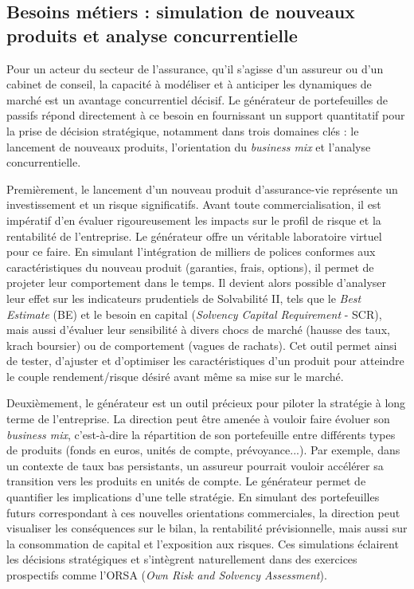 \subsection{Besoins métiers : simulation de nouveaux produits et analyse concurrentielle}

Pour un acteur du secteur de l'assurance, qu'il s'agisse d'un assureur ou d'un cabinet de conseil, la capacité à modéliser et à anticiper les dynamiques de marché est un avantage concurrentiel décisif. Le générateur de portefeuilles de passifs répond directement à ce besoin en fournissant un support quantitatif pour la prise de décision stratégique, notamment dans trois domaines clés : le lancement de nouveaux produits, l'orientation du \textit{business mix} et l'analyse concurrentielle.

Premièrement, le lancement d'un nouveau produit d'assurance-vie représente un investissement et un risque significatifs. Avant toute commercialisation, il est impératif d'en évaluer rigoureusement les impacts sur le profil de risque et la rentabilité de l'entreprise. Le générateur offre un véritable laboratoire virtuel pour ce faire. En simulant l'intégration de milliers de polices conformes aux caractéristiques du nouveau produit (garanties, frais, options), il permet de projeter leur comportement dans le temps. Il devient alors possible d'analyser leur effet sur les indicateurs prudentiels de Solvabilité II, tels que le \textit{Best Estimate} (BE) et le besoin en capital (\textit{Solvency Capital Requirement} - SCR), mais aussi d'évaluer leur sensibilité à divers chocs de marché (hausse des taux, krach boursier) ou de comportement (vagues de rachats). Cet outil permet ainsi de tester, d'ajuster et d'optimiser les caractéristiques d'un produit pour atteindre le couple rendement/risque désiré avant même sa mise sur le marché.

Deuxièmement, le générateur est un outil précieux pour piloter la stratégie à long terme de l'entreprise. La direction peut être amenée à vouloir faire évoluer son \textit{business mix}, c'est-à-dire la répartition de son portefeuille entre différents types de produits (fonds en euros, unités de compte, prévoyance...). Par exemple, dans un contexte de taux bas persistants, un assureur pourrait vouloir accélérer sa transition vers les produits en unités de compte. Le générateur permet de quantifier les implications d'une telle stratégie. En simulant des portefeuilles futurs correspondant à ces nouvelles orientations commerciales, la direction peut visualiser les conséquences sur le bilan, la rentabilité prévisionnelle, mais aussi sur la consommation de capital et l'exposition aux risques. Ces simulations éclairent les décisions stratégiques et s'intègrent naturellement dans des exercices prospectifs comme l'ORSA (\textit{Own Risk and Solvency Assessment}).

